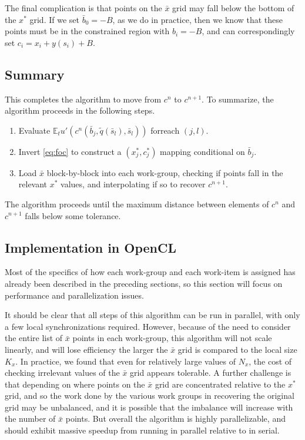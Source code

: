 \documentclass[a4paper,12pt]{article}
\newcommand{\E}{\mathbb{E}}
\numberwithin{equation}{section}
\theoremstyle{definition}
\begin{document}
The final complication is that points on the $\bar{x}$ grid may fall
below the bottom of the $x^*$ grid. If we set $\bar{b}_0 = -B$, as we
do in practice, then we know that these points must be in the
constrained region with $b_i = -B$, and can correspondingly set $c_i =
x_i + y(s_i) + B$.

\subsection{Summary}

This completes the algorithm to move from $c^n$ to $c^{n+1}$. To
summarize, the algorithm proceeds in the following steps.

\begin{enumerate}
\item Evaluate $\E_t u'(c^n(\bar{b}_j, \tilde{q}(\bar{s}_l),
  \bar{s}_l))$ forreach $(j,l)$.
\item Invert \eqref{eq:foc} to construct a $(x_j^*, c_j^*)$ mapping
  conditional on $\bar{b}_j$.
\item Load $\bar{x}$ block-by-block into each work-group, checking if
  points fall in the relevant $x^*$ values, and interpolating if so
  to recover $c^{n+1}$.
\end{enumerate}

The algorithm proceeds until the maximum distance between elements of
$c^n$ and $c^{n+1}$ falls below some tolerance.

\subsection{Implementation in OpenCL}

Most of the specifics of how each work-group and each work-item is
assigned has already been described in the preceding sections, so
this section will focus on performance and parallelization issues.

It should be clear that all steps of this algorithm can be run in
parallel, with only a few local synchronizations required. However,
because of the need to consider the entire list of $\bar{x}$ points in
each work-group, this algorithm will not scale linearly, and will lose
efficiency the larger the $\bar{x}$ grid is compared to the local size
$K_x$. In practice, we found that even for relatively large values of
$N_x$, the cost of checking irrelevant values of the $\bar{x}$ grid
appears tolerable. A further challenge is that depending on where
points on the $\bar{x}$ grid are concentrated relative to the $x^*$
grid, and so the work done by the various work groups in recovering
the original grid may be unbalanced, and it is possible that the
imbalance will increase with the number of $\bar{x}$ points. But
overall the algorithm is highly parallelizable, and should exhibit
massive speedup from running in parallel relative to in serial.
\end{document}
